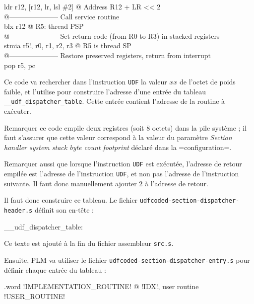 \begin{SHELL}
\hspace*{1.2em}ldr   r12, [r12, lr, lsl \#2]   @ Address R12 + LR << 2\\
@--------------------- Call service routine\\
\hspace*{1.2em}blx   r12                      @ R5: thread PSP\\
@--------------------- Set return code (from R0 to R3) in stacked registers\\
\hspace*{1.2em}stmia r5!, {r0, r1, r2, r3}    @ R5 is thread SP\\
@--------------------- Restore preserved registers, return from interrupt\\
\hspace*{1.2em}pop   {r5, pc}
\end{SHELL}

Ce code va rechercher dans l'instruction \texttt{UDF} la valeur $xx$ de l'octet de poids faible, et l'utilise pour construire l'adresse d'une entrée du tableau \texttt{\_\_udf\_dispatcher\_table}. Cette entrée contient l'adresse de la routine à exécuter.

Remarquer ce code empile deux registres (soit 8 octets) dans la pile système ; il faut s'assurer que cette valeur correspond à la valeur du paramètre \emph{Section handler system stack byte count footprint} déclaré dans la \plm=configuration=.

Remarquer aussi que lorsque l'instruction \texttt{UDF} est exécutée, l'adresse de retour empilée est l'adresse de l'instruction \texttt{UDF}, et non pas l'adresse de l'instruction suivante. Il faut donc manuellement ajouter $2$ à l'adresse de retour.

Il faut donc construire ce tableau. Le fichier \texttt{udfcoded-section-dispatcher-header.s} définit son en-tête :

\begin{SHELL}\small
\_\_udf\_dispatcher\_table:
\end{SHELL}

Ce texte est ajouté à la fin du fichier assembleur \texttt{src.s}.

Ensuite, PLM va utiliser le fichier \texttt{udfcoded-section-dispatcher-entry.s} pour définir chaque entrée du tableau :
\begin{SHELL}\small
\hspace*{1.2em}.word !IMPLEMENTATION\_ROUTINE! @ !IDX!, user routine !USER\_ROUTINE!

\end{SHELL}

